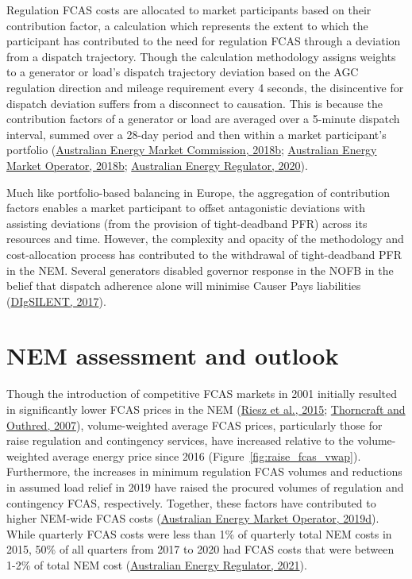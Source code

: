 \documentclass[12pt,a4paper,]{report}
\begin{document}
Regulation FCAS costs are allocated to market participants based on
their contribution factor, a calculation which represents the extent to
which the participant has contributed to the need for regulation FCAS
through a deviation from a dispatch trajectory. Though the calculation
methodology assigns weights to a generator or load's dispatch trajectory
deviation based on the AGC regulation direction and mileage requirement
every 4 seconds, the disincentive for dispatch deviation suffers from a
disconnect to causation. This is because the contribution factors of a
generator or load are averaged over a 5-minute dispatch interval, summed
over a 28-day period and then within a market participant's portfolio
(\protect\hyperlink{ref-australianenergymarketcommissionFrequencyControlFrameworks2018}{Australian
Energy Market Commission, 2018b};
\protect\hyperlink{ref-australianenergymarketoperatorRegulationFCASContribution2018a}{Australian
Energy Market Operator, 2018b};
\protect\hyperlink{ref-australianenergyregulatorIssuesPaperSemi2020}{Australian
Energy Regulator, 2020}).

Much like portfolio-based balancing in Europe, the aggregation of
contribution factors enables a market participant to offset antagonistic
deviations with assisting deviations (from the provision of
tight-deadband PFR) across its resources and time. However, the
complexity and opacity of the methodology and cost-allocation process
has contributed to the withdrawal of tight-deadband PFR in the NEM.
Several generators disabled governor response in the NOFB in the belief
that dispatch adherence alone will minimise Causer Pays liabilities
(\protect\hyperlink{ref-digsilentReviewFrequencyControl2017}{DIgSILENT,
2017}).

\hypertarget{nem-assessment-and-outlook}{%
\section{NEM assessment and outlook}\label{nem-assessment-and-outlook}}

Though the introduction of competitive FCAS markets in 2001 initially
resulted in significantly lower FCAS prices in the NEM
(\protect\hyperlink{ref-rieszFrequencyControlAncillary2015}{Riesz et
al., 2015};
\protect\hyperlink{ref-thorncraftExperienceMarketbasedAncillary2007}{Thorncraft
and Outhred, 2007}), volume-weighted average FCAS prices, particularly
those for raise regulation and contingency services, have increased
relative to the volume-weighted average energy price since 2016
(Figure~\ref{fig:raise_fcas_vwap}). Furthermore, the increases in
minimum regulation FCAS volumes and reductions in assumed load relief in
2019 have raised the procured volumes of regulation and contingency
FCAS, respectively. Together, these factors have contributed to higher
NEM-wide FCAS costs
(\protect\hyperlink{ref-australianenergymarketoperatorReviewNEMLoad2019}{Australian
Energy Market Operator, 2019d}). While quarterly FCAS costs were less
than 1\% of quarterly total NEM costs in 2015, 50\% of all quarters from
2017 to 2020 had FCAS costs that were between 1-2\% of total NEM cost
(\protect\hyperlink{ref-australianenergyregulatorStateEnergyMarket2021}{Australian
Energy Regulator, 2021}).
\end{document}
